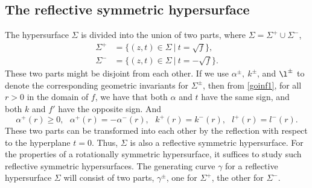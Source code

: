 \documentclass[12pt]{amsart}
\theoremstyle{definition}\newtheorem{exa}[thm]{\sc Example}
\theoremstyle{definition}\newtheorem{de}[thm]{\sc Definition}
\theoremstyle{definition}\newtheorem{rem}[thm]{\sc Remark}
\theoremstyle{definition}\newtheorem{prob}[thm]{\it Problem}
\theoremstyle{definition}\newtheorem{fact}[thm]{\sc Fact}
\theoremstyle{definition}\newtheorem{claim}[thm]{\sc Claim}
\numberwithin{equation}{section}
\begin{document}
\subsection{The reflective symmetric hypersurface}\label{maross}
The hypersurface $\Sigma$ is divided into the union of two parts, where
$\Sigma=\Sigma^{+}\cup\Sigma^{-}$,
\begin{equation}
\begin{split}
\Sigma^{+}&=\{(z,t)\in\Sigma\ |\ t=\sqrt{f}\},\\
\Sigma^{-}&=\{(z,t)\in\Sigma\ |\ t=-\sqrt{f}\}.
\end{split}
\end{equation}
These two parts might be disjoint from each other. If we use $\alpha^{\pm},\ k^{\pm}$, and $\l^{\pm}$ to denote the corresponding geometric invariants for $\Sigma^{\pm}$, then from \eqref{goinf1}, for all $r> 0$ in the domain of $f$, we have that both $\alpha$ and $t$ have the same sign, and both $k$ and $f'$ have the opposite sign. And
\begin{equation}\label{relge}
\alpha^{+}(r)\geq 0,\ \ \ \alpha^{+}(r)=-\alpha^{-}(r),\ \ \ k^{+}(r)=k^{-}(r),\ \ \ l^{+}(r)=l^{-}(r).
\end{equation}
These two parts can be transformed into each other by the reflection with respect to the hyperplane $t=0$. Thus, $\Sigma$ is also a reflective symmetric hypersurface. For the properties of a rotationally symmetric hypersurface, it suffices to study such reflective symmetric hypersurfaces. The generating curve $\gamma$ for a reflective hypersurface $\Sigma$ will consist of two parts, $\gamma^{\pm}$, one for $\Sigma^{+}$, the other for $\Sigma^{-}$.
\end{document}
